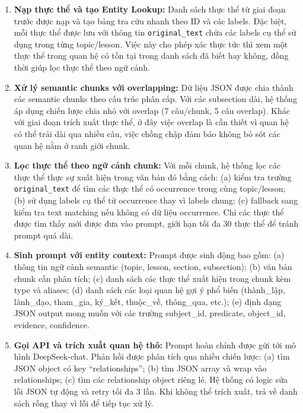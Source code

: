 \begin{enumerate}
    \item \textbf{Nạp thực thể và tạo Entity Lookup:} Danh sách thực thể từ giai đoạn trước được nạp và tạo bảng tra cứu nhanh theo ID và các labels. Đặc biệt, mỗi thực thể được lưu với thông tin \texttt{original\_text} chứa các labels cụ thể sử dụng trong từng topic/lesson. Việc này cho phép xác thực tức thì xem một thực thể trong quan hệ có tồn tại trong danh sách đã biết hay không, đồng thời giúp lọc thực thể theo ngữ cảnh.

    \item \textbf{Xử lý semantic chunks với overlapping:} Dữ liệu JSON được chia thành các semantic chunks theo cấu trúc phân cấp. Với các subsection dài, hệ thống áp dụng chiến lược chia nhỏ với overlap (7 câu/chunk, 5 câu overlap). Khác với giai đoạn trích xuất thực thể, ở đây việc overlap là cần thiết vì quan hệ có thể trải dài qua nhiều câu, việc chồng chập đảm bảo không bỏ sót các quan hệ nằm ở ranh giới chunk.

    \item \textbf{Lọc thực thể theo ngữ cảnh chunk:} Với mỗi chunk, hệ thống lọc các thực thể thực sự xuất hiện trong văn bản đó bằng cách: (a) kiểm tra trường \texttt{original\_text} để tìm các thực thể có occurrence trong cùng topic/lesson; (b) sử dụng labels cụ thể từ occurrence thay vì labels chung; (c) fallback sang kiểm tra text matching nếu không có dữ liệu occurrence. Chỉ các thực thể được tìm thấy mới được đưa vào prompt, giới hạn tối đa 30 thực thể để tránh prompt quá dài.

    \item \textbf{Sinh prompt với entity context:} Prompt được sinh động bao gồm: (a) thông tin ngữ cảnh semantic (topic, lesson, section, subsection); (b) văn bản chunk cần phân tích; (c) danh sách các thực thể xuất hiện trong chunk kèm type và aliases; (d) danh sách các loại quan hệ gợi ý phổ biến (thành\_lập, lãnh\_đạo, tham\_gia, ký\_kết, thuộc\_về, thông\_qua, etc.); (e) định dạng JSON output mong muốn với các trường subject\_id, predicate, object\_id, evidence, confidence.

    \item \textbf{Gọi API và trích xuất quan hệ thô:} Prompt hoàn chỉnh được gửi tới mô hình DeepSeek-chat. Phản hồi được phân tích qua nhiều chiến lược: (a) tìm JSON object có key ``relationships''; (b) tìm JSON array và wrap vào relationships; (c) tìm các relationship object riêng lẻ. Hệ thống có logic sửa lỗi JSON tự động và retry tối đa 3 lần. Khi không thể trích xuất, trả về danh sách rỗng thay vì lỗi để tiếp tục xử lý.


\end{enumerate}
